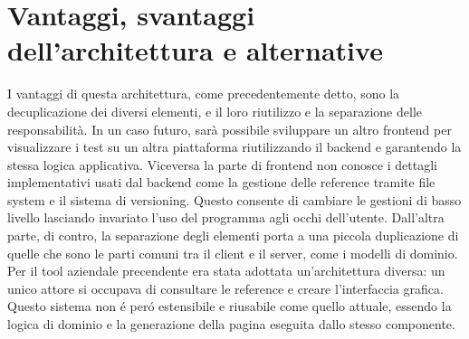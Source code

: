     \section{Vantaggi, svantaggi dell'architettura e alternative}
        I vantaggi di questa architettura, come precedentemente detto, sono la decuplicazione dei diversi elementi, e il loro riutilizzo e la separazione delle responsabilità.
        In un caso futuro, sarà possibile sviluppare un altro frontend per visualizzare i test su un altra piattaforma riutilizzando il backend e garantendo la stessa logica applicativa.
        Viceversa la parte di frontend non conosce i dettagli implementativi usati dal backend come la gestione delle reference tramite file system e il sistema di versioning.
        Questo consente di cambiare le gestioni di basso livello lasciando invariato l'uso del programma agli occhi dell'utente.  
        Dall'altra parte, di contro, la separazione degli elementi porta a una piccola duplicazione di quelle che sono le parti comuni tra il client e il server, come i modelli di dominio.
        Per il tool aziendale precendente era stata adottata un'architettura diversa: un unico attore si occupava di consultare le reference e creare l'interfaccia grafica. 
        Questo sistema non \'e per\'o estensibile e riusabile come quello attuale, essendo la logica di dominio e la generazione della pagina eseguita dallo stesso componente.
